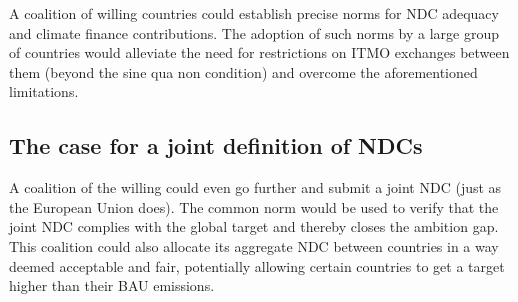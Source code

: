 \documentclass[12pt,english]{article}
\begin{document}
A coalition of willing countries could %
establish precise norms for NDC adequacy and climate finance contributions. The adoption of such norms by a large group of countries would alleviate the need for restrictions on ITMO exchanges between them (beyond the sine qua non condition) and overcome the aforementioned limitations.


\subsection{The case for a joint definition of NDCs}\label{subsec:itmo_proposal}

A coalition of the willing could even go further and submit a joint NDC %
(just as the European Union does). 
The common norm would be used to verify that the joint NDC complies with the global target and thereby closes the ambition gap. %
This coalition could also allocate its aggregate NDC between countries in a way deemed acceptable and fair, potentially allowing certain countries to get a target higher than their BAU emissions. 
\end{document}
